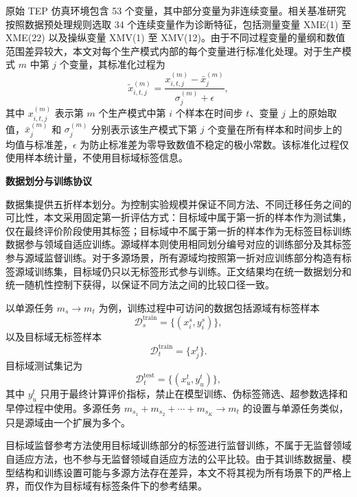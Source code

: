 \documentclass{seuthesis-2022}
\begin{document}
原始 TEP 仿真环境包含 53 个变量，其中部分变量为非连续变量。相关基准研究按照数据预处理规则选取 34 个连续变量作为诊断特征，包括测量变量 XME(1) 至 XME(22) 以及操纵变量 XMV(1) 至 XMV(12)\cite{montesuma2024benchmark}。由于不同过程变量的量纲和数值范围差异较大，本文对每个生产模式内部的每个变量进行标准化处理。对于生产模式 $m$ 中第 $j$ 个变量，其标准化过程为
\begin{equation}
    \tilde{x}_{i,t,j}^{(m)}
    =
    \frac{x_{i,t,j}^{(m)}-\bar{x}_{j}^{(m)}}{\sigma_{j}^{(m)}+\epsilon},
\end{equation}
其中 $x_{i,t,j}^{(m)}$ 表示第 $m$ 个生产模式中第 $i$ 个样本在时间步 $t$、变量 $j$ 上的原始取值，$\bar{x}_{j}^{(m)}$ 和 $\sigma_{j}^{(m)}$ 分别表示该生产模式下第 $j$ 个变量在所有样本和时间步上的均值与标准差，$\epsilon$ 为防止标准差为零导致数值不稳定的极小常数。该标准化过程仅使用样本统计量，不使用目标域标签信息。

\medskip
\noindent\textbf{数据划分与训练协议}

数据集提供五折样本划分。为控制实验规模并保证不同方法、不同迁移任务之间的可比性，本文采用固定第一折评估方式：目标域中属于第一折的样本作为测试集，仅在最终评价阶段使用其标签；目标域中不属于第一折的样本作为无标签目标训练数据参与领域自适应训练。源域样本则使用相同划分编号对应的训练部分及其标签参与源域监督训练。对于多源场景，所有源域均按照第一折对应训练部分构造有标签源域训练集，目标域仍只以无标签形式参与训练。正文结果均在统一数据划分和统一随机性控制下获得，以保证不同方法之间的比较口径一致。

以单源任务 $m_s \rightarrow m_t$ 为例，训练过程中可访问的数据包括源域有标签样本
\begin{equation}
    \mathcal{D}_{s}^{\mathrm{train}}
    =
    \{(x_i^{s},y_i^{s})\},
\end{equation}
以及目标域无标签样本
\begin{equation}
    \mathcal{D}_{t}^{\mathrm{train}}
    =
    \{x_j^{t}\}.
\end{equation}
目标域测试集记为
\begin{equation}
    \mathcal{D}_{t}^{\mathrm{test}}
    =
    \{(x_u^{t},y_u^{t})\},
\end{equation}
其中 $y_u^{t}$ 只用于最终计算评价指标，禁止在模型训练、伪标签筛选、超参数选择和早停过程中使用。多源任务 $m_{s_1}+m_{s_2}+\cdots+m_{s_K}\rightarrow m_t$ 的设置与单源任务类似，只是源域由一个扩展为多个。

目标域监督参考方法使用目标域训练部分的标签进行监督训练，不属于无监督领域自适应方法，也不参与无监督领域自适应方法的公平比较。由于其训练数据量、模型结构和训练设置可能与多源方法存在差异，本文不将其视为所有场景下的严格上界，而仅作为目标域有标签条件下的参考结果。
\end{document}
